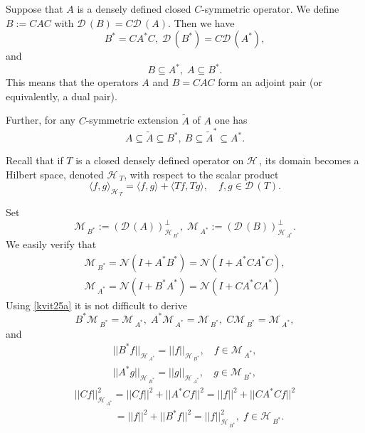 \documentclass[12pt]{amsart}
\theoremstyle{definition}
\newcommand{\cM}{\mathcal{M}\,}
\newcommand{\cD}{\mathcal{D}\,}
\newcommand{\cH}{\mathcal{H}\,}
\newcommand{\cN}{\mathcal{N}}
\begin{document}
Suppose that  $A$ is a densely defined closed $C$-symmetric operator. We define $B:=CAC$ with $\cD(B)=C\cD(A)$.
Then we have
\[
B^*=CA^*C,\;  \cD( B^*)=C\cD( A^*),
\]
and
\[
B\subseteq A^*,\; A\subseteq B^*.
\]
This means that the operators $A$ and $B=CAC$ form an adjoint pair (or equivalently, a dual pair).

Further, for any $C$-symmetric extension $\widetilde A$ of $A$ one has
\[
A\subseteq \widetilde A\subseteq B^*,\: B\subseteq \widetilde A^*\subseteq A^*.
\]

Recall that if $T$ is a closed densely defined operator on $\cH$,  its domain becomes a Hilbert space, denoted  $\cH_T$, with respect to the scalar product
\begin{equation}\label{22agua}
\langle f,g\rangle_{\cH_T}=\langle f,g\rangle +\langle Tf,Tg\rangle, \quad f,g\in \cD(T).
\end{equation}

Set
\begin{equation}\label{23agua}
\cM_{B^*}:=(\cD( A))^\perp_{\cH_{B^*}},\;\cM_{A^*}:=(\cD( B))^\perp_{\cH_{A^*}}.
\end{equation}
 We easily verify that
\begin{equation}\label{kvit25a}\begin{array}{l}
\cM_{B^*}=\cN(I+A^*B^*)=\cN(I+A^*CA^*C),\\[2mm]
\cM_{A^*}=\cN(I+B^*A^*)=\cN(I+CA^*CA^*)
\end{array}
\end{equation}
Using \eqref{kvit25a}  it is not difficult to derive
\begin{equation}\label{trav01a}
B^*\cM_{B^*}=\cM_{A^*},\;A^*\cM_{A^*}=\cM_{B^*},\; C\cM_{B^*}=\cM_{A^*},
\end{equation}
and
\begin{equation}\label{trav21a}
\begin{array}{l}
||B^*f||_{\cH_{A^*}}=||f||_{\cH_{B^*}},\; ~~~ f\in\cM_{A^*},\\[2mm]
||A^*g||_{\cH_{B^*}}=||g||_{\cH_{A^*}},\;~~~ g\in\cM_{B^*},
\end{array}
\end{equation}
\begin{equation}\label{trav22aa}
\begin{array}{l}
||Cf||_{\cH_{A^*}}^2=||Cf||^2+||A^*Cf||^2=||f||^2+||CA^*Cf||^2\\
\qquad\qquad=||f||^2+||B^*f||^2=||f||^2_{\cH_{B^*}},\; f\in\cH_{B^*}.
\end{array}
\end{equation}
\end{document}
